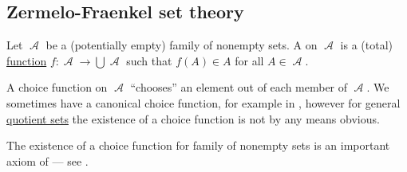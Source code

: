 \subsection{Zermelo-Fraenkel set theory}\label{subsec:zermelo_fraenkel_set_theory}

\begin{definition}\label{def:choice_function}
  Let \( \mscrA \) be a (potentially empty) family of nonempty sets. A  on \( \mscrA \) is a (total) \hyperref[def:function]{function} \( f: \mscrA \to \bigcup \mscrA \) such that \( f(A) \in A \) for all \( A \in \mscrA \).

  A choice function on \( \mscrA \) \enquote{chooses} an element out of each member of \( \mscrA \). We sometimes have a canonical choice function, for example in , however for general \hyperref[def:equivalence_relation/quotient]{quotient sets} the existence of a choice function is not by any means obvious.

  The existence of a choice function for family of nonempty sets is an important axiom of  --- see .
\end{definition}

